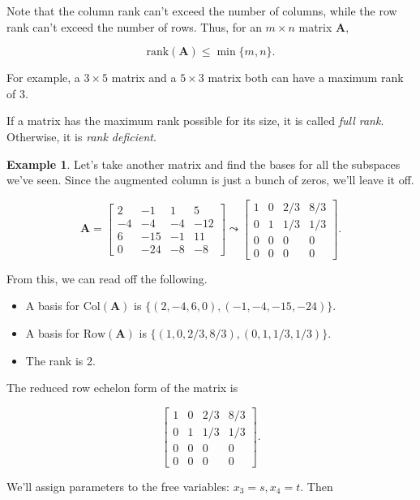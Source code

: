 \documentclass[
]{book}
\theoremstyle{definition}
\theoremstyle{definition}
\newtheorem{example}{Example}[chapter]
\theoremstyle{definition}
\theoremstyle{definition}
\theoremstyle{remark}
\begin{document}
Note that the column rank can't exceed the number of columns, while the row rank can't exceed the number of rows. Thus, for an \(m\times n\) matrix \(\mathbf{A},\)

\[\text{rank}(\mathbf{A})\leq \min\{m,n\}.\]

For example, a \(3\times 5\) matrix and a \(5\times 3\) matrix both can have a maximum rank of 3.

If a matrix has the maximum rank possible for its size, it is called \emph{full rank}. Otherwise, it is \emph{rank deficient}.

\begin{examplebox}

\begin{example}
Let's take another matrix and find the bases for all the subspaces we've seen. Since the augmented column is just a bunch of zeros, we'll leave it off.

\[\mathbf{A}=\begin{bmatrix}2 & -1 & 1 & 5\\-4 & -4 & -4 & -12\\6 & -15 & -1 & 11\\0 & -24 & -8 & -8\end{bmatrix}\leadsto \begin{bmatrix}1&0 & 2/3 & 8/3\\0 & 1 & 1/3 & 1/3\\0 & 0 & 0 & 0 \\0 & 0 & 0 & 0\end{bmatrix}.\]

From this, we can read off the following.

\begin{itemize}
\item
  A basis for \(\text{Col}(\mathbf{A})\) is \(\{(2,-4,6,0),(-1,-4,-15,-24)\}\).
\item
  A basis for \(\text{Row}(\mathbf{A})\) is \(\{(1,0,2/3,8/3),(0,1,1/3,1/3)\}\).
\item
  The rank is 2.
\end{itemize}

The reduced row echelon form of the matrix is

\[\begin{bmatrix}1&0 & 2/3 & 8/3\\0 & 1 & 1/3 & 1/3\\0 & 0 & 0 & 0 \\0 & 0 & 0 & 0\end{bmatrix}.\]

We'll assign parameters to the free variables: \(x_3=s,x_4=t\). Then


\end{example}
\end{examplebox}
\end{document}
